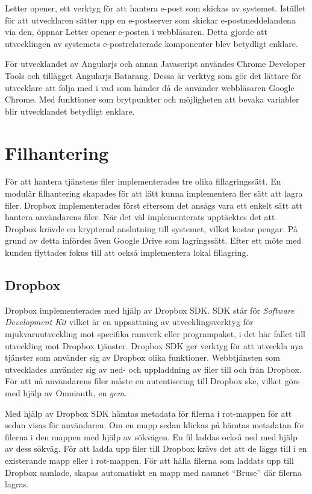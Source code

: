 Letter opener, ett verktyg för att hantera e-post som skickas av systemet. Istället för att utvecklaren sätter upp en e-postserver som skickar e-postmeddelandena via den, öppnar Letter opener e-posten i webbläsaren. Detta gjorde att utvecklingen av systemets e-postrelaterade komponenter blev betydligt enklare.

För utvecklandet av Angularjs och annan Javascript användes Chrome Developer Tools och tillägget Angularjs Batarang. Dessa är verktyg som gör det lättare för utvecklare att följa med i vad som händer då de använder webbläsaren Google Chrome. Med funktioner som brytpunkter och möjligheten att bevaka variabler blir utvecklandet betydligt enklare.

\section{Filhantering}
För att hantera tjänstens filer implementerades tre olika fillagringssätt. En modulär filhantering skapades för att lätt kunna implementera fler sätt att lagra filer. Dropbox implementerades först eftersom det ansågs vara ett enkelt sätt att hantera användarens filer. När det väl implementerats upptäcktes det att Dropbox krävde en krypterad anslutning till systemet, vilket kostar pengar. På grund av detta infördes även Google Drive som lagringssätt. Efter ett möte med kunden flyttades fokus till att också implementera lokal fillagring.

\subsection{Dropbox}
Dropbox implementerades med hjälp av Dropbox SDK. SDK står för \textit{Software Development Kit} vilket är en uppsättning av utvecklingsverktyg för mjukvaruutveckling mot specifika ramverk eller programpaket, i det här fallet till utveckling mot Dropbox tjänster. Dropbox SDK ger verktyg för att utveckla nya tjänster som använder sig av Dropbox olika funktioner. Webbtjänsten som utvecklades använder sig av ned- och uppladdning av filer till och från Dropbox. För att nå användarens filer måste en autentisering till Dropbox ske, vilket görs med hjälp av Omniauth, en \textit{gem}.

Med hjälp av Dropbox SDK hämtas metadata för filerna i rot-mappen för att sedan visas för användaren. Om en mapp sedan klickas på hämtas metadatan för filerna i den mappen med hjälp av sökvägen. En fil laddas också ned med hjälp av dess sökväg. För att ladda upp filer till Dropbox krävs det att de läggs till i en existerande mapp eller i rot-mappen. För att hålla filerna som laddats upp till Dropbox samlade, skapas automatiskt en mapp med namnet “Bruse” där filerna lagras.

